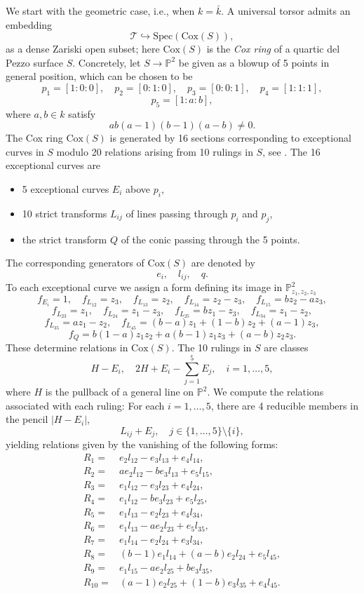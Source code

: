 \documentclass[12pt, reqno]{amsart}
\theoremstyle{plain}
\theoremstyle{remark}
\theoremstyle{definition}
\numberwithin{equation}{section}
\def\cT{{\mathcal T}}
\def\bP{{\mathbb P}}
\def\Cox{\mathrm{Cox}}
\def\Spec{\mathrm{Spec}}
\begin{document}
We start with the geometric case, i.e., when $k=\bar{k}$. 
A universal torsor admits an embedding 
$$
\cT\hookrightarrow\Spec(\Cox(S)),
$$
as a dense Zariski open subset; 
here $\Cox(S)$ is the {\em Cox ring} of a quartic del Pezzo surface $S$. 
Concretely, let $S\to \bP^2$ be given as a blowup of 5 points in general position, which can be chosen to be
$$
p_1=[1:0:0],\quad p_2=[0:1:0],\quad p_3=[0:0:1], \quad  p_4=[1:1:1], 
$$
$$
p_5=[1:a:b],
$$
where $a,b\in k$ satisfy
$$
ab(a-1)(b-1)(a-b)\neq 0. 
$$
 The Cox ring $\Cox(S)$ is generated by 16 sections corresponding to exceptional curves in $S$ modulo 20 relations arising from 10 rulings in $S$, see \cite[Theorem 4.9]{batycox}. 
The 16 exceptional curves are 
\begin{itemize}
    \item 5 exceptional curves $E_i$ above $p_i$,
    \item  10 strict transforms $L_{ij}$ of lines  passing through $p_i$ and $p_j$,
    \item the strict transform $Q$ of the conic passing through the 5 points.
\end{itemize}
The corresponding generators of $\Cox(S)$ are denoted by 
$$
e_i,\quad l_{ij},\quad q.
$$
To each exceptional curve we assign a form defining its image in $\bP^2_{z_1,z_2,z_3}$ 
$$
f_{E_i}=1,\quad f_{L_{12}}=z_3,\quad f_{L_{13}}=z_2,\quad f_{L_{14}}=z_2-z_3,\quad f_{L_{15}}=bz_2-az_3,
$$   
$$
f_{L_{23}}=z_1,\quad f_{L_{24}}=z_1-z_3,\quad f_{L_{25}}=bz_1-z_3,\quad f_{L_{34}}=z_1-z_2,
$$
$$
f_{L_{35}}=az_1-z_2,\quad f_{L_{45}}=(b-a)z_1+(1-b)z_2+(a-1)z_3,
$$
$$
f_Q=b(1-a)z_1z_2+a(b-1)z_1z_3+(a-b)z_2z_3.
$$
 These determine relations in $\Cox(S)$. The 10 rulings in $S$ are classes
$$
H-E_i,\quad 2H+E_i-\sum_{j=1}^5E_j,\quad i=1,\ldots,5,
$$
where $H$ is the pullback of a general line on $\bP^2$.
We compute the relations associated with each ruling: For each $i=1,\ldots,5$, there are 4 reducible members in the pencil $|H-E_i|$, 
    $$
    L_{ij}+E_j, \quad j\in\{1,\ldots,5\}\setminus\{ i\},
    $$
yielding relations given by the vanishing of the following forms:
    \begin{align*}
       R_1={}&e_2l_{12}-e_3l_{13}+e_4l_{14},\\
R_2={}&a e_2l_{12}-b e_3l_{13}+e_5l_{15},\\
R_3={}&e_1l_{12}-e_3l_{23}+e_4l_{24},\\
R_4={}&e_1l_{12}-b e_3l_{23}+e_5l_{25},\\
R_5={}&e_1l_{13}-e_2l_{23}+e_4l_{34},\\
R_6={}&e_1l_{13}-a e_2l_{23}+e_5l_{35},\\
R_7={}&e_1l_{14}-e_2l_{24}+e_3l_{34},\\
R_8={}&(b-1)e_1l_{14}+(a-b)e_2l_{24}+e_5l_{45},\\
R_9={}&e_1l_{15}-a e_2l_{25}+b e_3l_{35},\\
R_{10}={}&(a-1)e_2l_{25}+(1-b)e_3l_{35}+e_4l_{45}.
    \end{align*}
\end{document}
